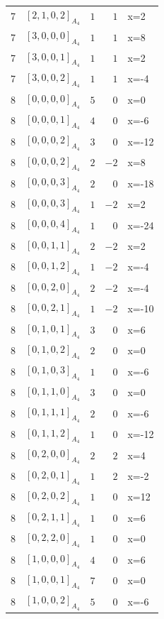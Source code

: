 \documentclass[11pt]{article}
\newcommand{\Dynkin}[1]{#1}
\begin{document}
\begin{longtable}{r l r r l}
7 & $\Dynkin{[2,1,0,2]_{A_4}}$ & $1$ & $1$ & x=2\\
7 & $\Dynkin{[3,0,0,0]_{A_4}}$ & $1$ & $1$ & x=8\\
7 & $\Dynkin{[3,0,0,1]_{A_4}}$ & $1$ & $1$ & x=2\\
7 & $\Dynkin{[3,0,0,2]_{A_4}}$ & $1$ & $1$ & x=-4\\
8 & $\Dynkin{[0,0,0,0]_{A_4}}$ & $5$ & $0$ & x=0\\
8 & $\Dynkin{[0,0,0,1]_{A_4}}$ & $4$ & $0$ & x=-6\\
8 & $\Dynkin{[0,0,0,2]_{A_4}}$ & $3$ & $0$ & x=-12\\
8 & $\Dynkin{[0,0,0,2]_{A_4}}$ & $2$ & $-2$ & x=8\\
8 & $\Dynkin{[0,0,0,3]_{A_4}}$ & $2$ & $0$ & x=-18\\
8 & $\Dynkin{[0,0,0,3]_{A_4}}$ & $1$ & $-2$ & x=2\\
8 & $\Dynkin{[0,0,0,4]_{A_4}}$ & $1$ & $0$ & x=-24\\
8 & $\Dynkin{[0,0,1,1]_{A_4}}$ & $2$ & $-2$ & x=2\\
8 & $\Dynkin{[0,0,1,2]_{A_4}}$ & $1$ & $-2$ & x=-4\\
8 & $\Dynkin{[0,0,2,0]_{A_4}}$ & $2$ & $-2$ & x=-4\\
8 & $\Dynkin{[0,0,2,1]_{A_4}}$ & $1$ & $-2$ & x=-10\\
8 & $\Dynkin{[0,1,0,1]_{A_4}}$ & $3$ & $0$ & x=6\\
8 & $\Dynkin{[0,1,0,2]_{A_4}}$ & $2$ & $0$ & x=0\\
8 & $\Dynkin{[0,1,0,3]_{A_4}}$ & $1$ & $0$ & x=-6\\
8 & $\Dynkin{[0,1,1,0]_{A_4}}$ & $3$ & $0$ & x=0\\
8 & $\Dynkin{[0,1,1,1]_{A_4}}$ & $2$ & $0$ & x=-6\\
8 & $\Dynkin{[0,1,1,2]_{A_4}}$ & $1$ & $0$ & x=-12\\
8 & $\Dynkin{[0,2,0,0]_{A_4}}$ & $2$ & $2$ & x=4\\
8 & $\Dynkin{[0,2,0,1]_{A_4}}$ & $1$ & $2$ & x=-2\\
8 & $\Dynkin{[0,2,0,2]_{A_4}}$ & $1$ & $0$ & x=12\\
8 & $\Dynkin{[0,2,1,1]_{A_4}}$ & $1$ & $0$ & x=6\\
8 & $\Dynkin{[0,2,2,0]_{A_4}}$ & $1$ & $0$ & x=0\\
8 & $\Dynkin{[1,0,0,0]_{A_4}}$ & $4$ & $0$ & x=6\\
8 & $\Dynkin{[1,0,0,1]_{A_4}}$ & $7$ & $0$ & x=0\\
8 & $\Dynkin{[1,0,0,2]_{A_4}}$ & $5$ & $0$ & x=-6\\

\end{longtable}
\end{document}
